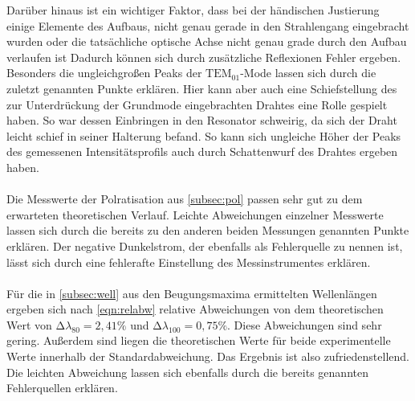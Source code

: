 Darüber hinaus ist ein wichtiger Faktor, dass bei der händischen Justierung einige Elemente des Aufbaus, nicht genau gerade in den Strahlengang eingebracht wurden oder die tatsächliche optische Achse nicht genau grade durch den Aufbau verlaufen ist
Dadurch können sich durch zusätzliche Reflexionen Fehler ergeben.
Besonders die ungleichgroßen Peaks der $\mathrm{TEM}_{01}$-Mode lassen
sich durch die zuletzt genannten Punkte erklären. 
Hier kann aber auch eine Schiefstellung des zur Unterdrückung der Grundmode eingebrachten Drahtes eine Rolle gespielt haben. 
So war dessen Einbringen in den Resonator schweirig, da sich der Draht leicht schief in seiner Halterung befand.
So kann sich ungleiche Höher der Peaks des gemessenen Intensitätsprofils auch durch Schattenwurf des Drahtes ergeben haben.
\\\\

Die Messwerte der Polratisation aus \autoref{subsec:pol} passen sehr gut zu dem erwarteten theoretischen Verlauf. 
Leichte Abweichungen einzelner Messwerte lassen sich durch die bereits zu den anderen beiden Messungen genannten Punkte erklären. 
Der negative Dunkelstrom, der ebenfalls als Fehlerquelle zu nennen ist, lässt sich durch eine fehlerafte Einstellung des Messinstrumentes erklären.
\\\\
Für die in \autoref{subsec:well} aus den Beugungsmaxima ermittelten Wellenlängen ergeben sich nach \autoref{eqn:relabw} relative Abweichungen von dem theoretischen Wert von $\increment \lambda_{80} = 2,41\%$ und $\increment \lambda_{100}= 0,75\%$.
Diese Abweichungen sind sehr gering.
Außerdem sind liegen die theoretischen Werte für beide experimentelle Werte innerhalb der Standardabweichung.
Das Ergebnis ist also zufriedenstellend.
Die leichten Abweichung lassen sich ebenfalls durch die bereits genannten Fehlerquellen erklären. 

